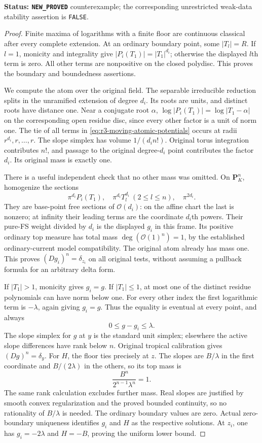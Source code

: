 \documentclass[11pt,a4paper]{article}
\numberwithin{equation}{section}
\theoremstyle{definition}
\theoremstyle{remark}
\begin{document}
\noindent\textbf{Status: \texttt{NEW\_PROVED}} counterexample;
the corresponding unrestricted weak-data stability assertion is
\texttt{FALSE}.

\begin{proof}
Finite maxima of logarithms with a finite floor are continuous
classical after every complete extension. At an ordinary boundary
point, some $|T_l|=R$. If $l=1$, monicity and integrality give
$|P_i(T_1)|=|T_1|^{d_i}$; otherwise the displayed $l$th term
is zero. All other terms are nonpositive on the closed polydisc.
This proves the boundary and boundedness assertions.

We compute the atom over the original field. The separable
irreducible reduction splits in the unramified extension of
degree $d_i$. Its roots are units, and distinct roots have
distance one. Near a conjugate root $\alpha$,
$\log|P_i(T_1)|=\log|T_1-\alpha|$ on the corresponding open
residue disc, since every other factor is a unit of norm one.
The tie of all terms in \eqref{eq:r3-moving-atomic-potentials}
occurs at radii $r^{d_i},r,\ldots,r$. The slope simplex has
volume $1/(d_i n!)$. Original torus integration contributes
$n!$, and passage to the original degree-$d_i$ point contributes
the factor $d_i$. Its original mass is exactly one.

There is a useful independent check that no other mass was
omitted. On $\mathbf P_K^n$, homogenize the sections
\[
 \pi^{d_i}P_i(T_1),\quad
 \pi^{d_i}T_l^{d_i}\ (2\leq l\leq n),\quad \pi^{2d_i}.
\]
They are base-point free sections of $\mathcal O(d_i)$:
on the affine chart the last is nonzero; at infinity their
leading terms are the coordinate $d_i$th powers. Their pure-FS
weight divided by $d_i$ is the displayed $g_i$ in this frame.
Its positive ordinary top measure has total mass
$\deg(\mathcal O(1)^n)=1$, by the established ordinary-current
model compatibility. The original atom already has mass one.
This proves $(Dg_i)^n=\delta_{z_i}$ on all original tests,
without assuming a pullback formula for an arbitrary delta form.

If $|T_1|>1$, monicity gives $g_i=g$. If $|T_1|\leq1$, at most
one of the distinct residue polynomials can have norm below one.
For every other index the first logarithmic term is $-\lambda$,
again giving $g_i=g$. Thus the equality is eventual at every
point, and always
\[
 0\leq g-g_i\leq\lambda.
\]
The slope simplex for $g$ at $y$ is the standard unit simplex;
elsewhere the active slope differences have rank below $n$.
Original tropical calibration gives $(Dg)^n=\delta_y$.
For $H$, the floor ties precisely at $z$. The slopes are
$B/\lambda$ in the first coordinate and $B/(2\lambda)$ in
the others, so its top mass is
\[
 \frac{B^n}{2^{n-1}\lambda^n}=1.
\]
The same rank calculation excludes further mass. Real slopes
are justified by smooth convex regularization and the proved
bounded continuity, so no rationality of $B/\lambda$ is needed.
The ordinary boundary values are zero. Actual zero-boundary
uniqueness identifies $g_i$ and $H$ as the respective solutions.
At $z_i$, one has $g_i=-2\lambda$ and $H=-B$, proving the
uniform lower bound.


\end{proof}
\end{document}
